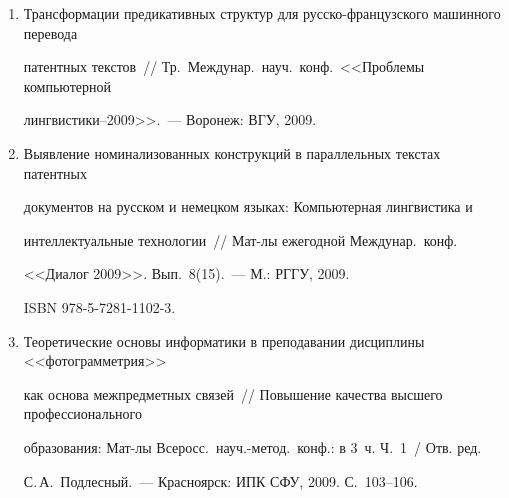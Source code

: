 \begin{enumerate}[1.]
Intelligent system for entities extraction (ISEE) from natural language texts~//  


Workshop (International) on Conceptual Structures for Extracting Natural Language Semantics~---


 Sense'09 


Proceedings~/ Eds.\ Uta Priss, Galia Angelova. 17th  Conference (International) on Conceptual 


Structures (ICCS'09) Priceedings.~--- M.: Higher School of Economics, Russia, 2009. 


P.~17--25.





\item {}


Трансформации предикативных структур для русско-французского машинного перевода 


патентных текстов~// Тр.\ Междунар.\ науч.\ конф.\ <<Проблемы компьютерной 


лингвистики--2009>>.~--- Воронеж: ВГУ, 2009.





\item {}


Выявление номинализованных конструкций в параллельных текстах патентных 


документов на русском и немецком языках: Компьютерная лингвистика и 


интеллектуальные технологии~// Мат-лы ежегодной Междунар.\ конф. 


<<Диалог 2009>>. Вып.~8(15).~--- М.: РГГУ, 2009. 


ISBN 978-5-7281-1102-3.





\item {}


Теоретические основы информатики в преподавании дисциплины <<фотограмметрия>> 


как основа межпредметных связей~// Повышение качества высшего профессионального 


образования: Мат-лы Всеросс.\ науч.-метод.\ конф.: в 3~ч. Ч.~1~/ Отв. ред. 


С.\,А.~Подлесный.~--- Красноярск: ИПК СФУ, 2009. С.~103--106.






\end{enumerate}
